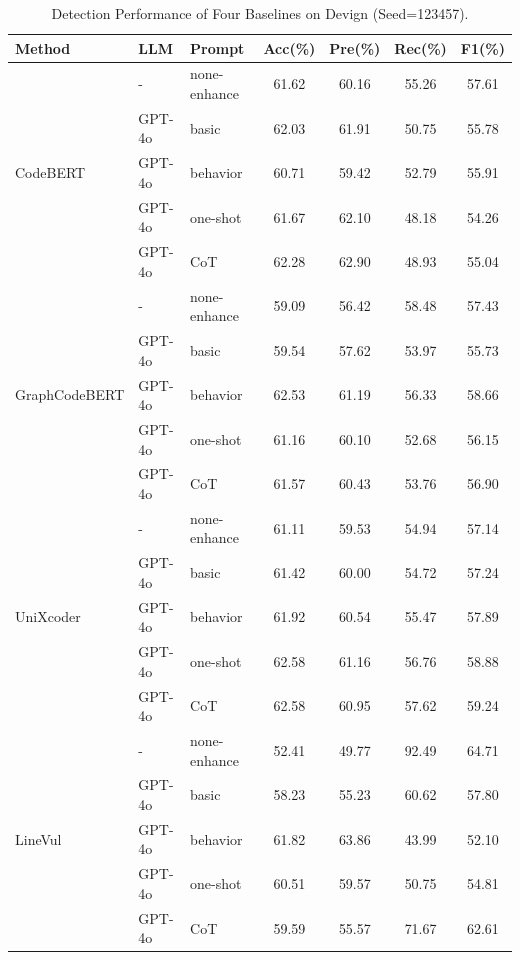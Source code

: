 \documentclass{article}
\begin{document}
\begin{table}[t]
\centering
\caption{Detection Performance of Four Baselines on Devign (Seed=123457).}
\label{tab:devign-four-models}
\setlength{\tabcolsep}{6pt}
\renewcommand{\arraystretch}{1.15}
\begin{tabular}{l l l c c c c}
\toprule
\textbf{Method} & \textbf{LLM} & \textbf{Prompt} & \textbf{Acc(\%)} & \textbf{Pre(\%)} & \textbf{Rec(\%)} & \textbf{F1(\%)} \\
\midrule

\multirow{5}{*}{CodeBERT} 
& -      & none-enhance & 61.62 & 60.16 & 55.26 & 57.61 \\
& GPT-4o & basic        & 62.03 & 61.91 & 50.75 & 55.78 \\
& GPT-4o & behavior     & 60.71 & 59.42 & 52.79 & 55.91 \\
& GPT-4o & one-shot     & 61.67 & 62.10 & 48.18 & 54.26 \\
& GPT-4o & CoT          & 62.28 & 62.90 & 48.93 & 55.04 \\
\midrule

\multirow{5}{*}{GraphCodeBERT}
& -      & none-enhance & 59.09 & 56.42 & 58.48 & 57.43 \\
& GPT-4o & basic        & 59.54 & 57.62 & 53.97 & 55.73 \\
& GPT-4o & behavior     & 62.53 & 61.19 & 56.33 & 58.66 \\
& GPT-4o & one-shot     & 61.16 & 60.10 & 52.68 & 56.15 \\
& GPT-4o & CoT          & 61.57 & 60.43 & 53.76 & 56.90 \\
\midrule

\multirow{5}{*}{UniXcoder}
& -      & none-enhance & 61.11 & 59.53 & 54.94 & 57.14 \\
& GPT-4o & basic        & 61.42 & 60.00 & 54.72 & 57.24 \\
& GPT-4o & behavior     & 61.92 & 60.54 & 55.47 & 57.89 \\
& GPT-4o & one-shot     & 62.58 & 61.16 & 56.76 & 58.88 \\
& GPT-4o & CoT          & 62.58 & 60.95 & 57.62 & 59.24 \\
\midrule

\multirow{5}{*}{LineVul}
& -      & none-enhance & 52.41 & 49.77 & 92.49 & 64.71 \\
& GPT-4o & basic        & 58.23 & 55.23 & 60.62 & 57.80 \\
& GPT-4o & behavior     & 61.82 & 63.86 & 43.99 & 52.10 \\
& GPT-4o & one-shot     & 60.51 & 59.57 & 50.75 & 54.81 \\
& GPT-4o & CoT          & 59.59 & 55.57 & 71.67 & 62.61 \\
\bottomrule
\end{tabular}
\end{table}
\end{document}
